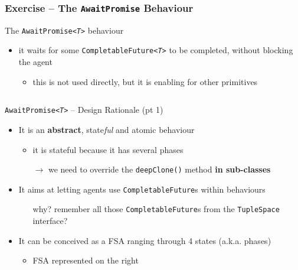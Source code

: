 \documentclass[presentation]{beamer}\mode<presentation>{\usetheme{AMSCesenaPurpleAndGold}}
\begin{document}
\begin{frame}[allowframebreaks]
	\frametitle{Exercise \currentExercise{} -- The \texttt{AwaitPromise} Behaviour}
	
	\begin{block}{The \texttt{AwaitPromise\textit{<T>}} behaviour}
		\begin{itemize}
			\item it waits for some \texttt{CompletableFuture\textit{<T>}} to be \alert{completed}, without blocking the agent
			\begin{itemize}\small
				\item this is not used directly, but it is enabling for other primitives
			\end{itemize}
		\end{itemize}
	\end{block}

	\framebreak

	\begin{columns}
		\begin{column}{.8\linewidth}
			\begin{exampleblock}{\texttt{AwaitPromise\textit{<T>}} -- Design Rationale (pt 1)}
				\begin{itemize}
					\item It is an \textbf{abstract}, \alert{state\emph{ful}} and \alert{atomic} behaviour
					\begin{itemize}
						\item it is stateful because it has several \alert{phases}
						\item[$\rightarrow$] we need to override the \texttt{\alert{deepClone()}} method \textbf{in sub-classes}
					\end{itemize}
					
					\medskip
					
					\item It aims at letting agents use \alert{\texttt{CompletableFuture}s} within behaviours
					\begin{itemize}
						\item[why?] remember all those \texttt{CompletableFuture}s from the \alert{\texttt{TupleSpace}} interface?
					\end{itemize}
					
					\medskip
					
					\item It can be conceived as a FSA ranging through 4 states (a.k.a. \alert{phases})
					\begin{itemize}
						\item FSA represented on the right
					\end{itemize}
					

\end{itemize}
\end{exampleblock}
\end{column}
\end{columns}
\end{frame}
\end{document}
